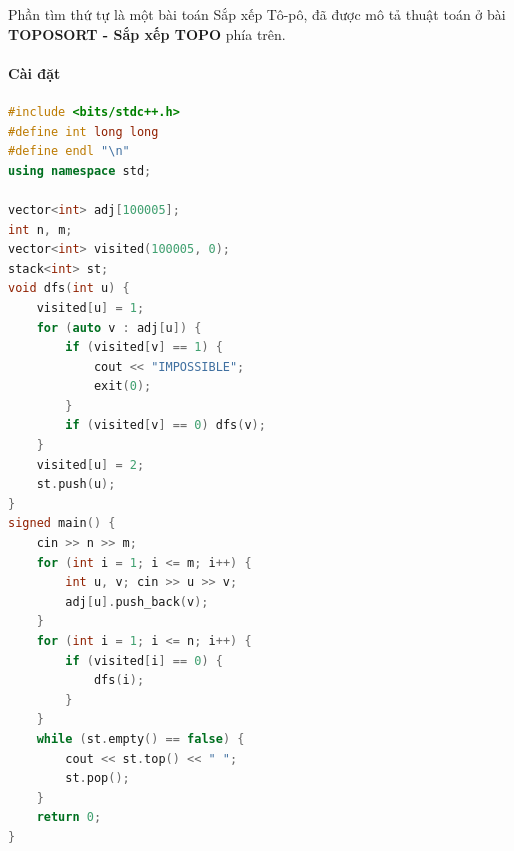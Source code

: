Phần tìm thứ tự là một bài toán Sắp xếp Tô-pô, đã được mô tả thuật toán ở bài \textbf{TOPOSORT - Sắp xếp TOPO} phía trên.

\paragraph{Cài đặt}
\begin{lstlisting}[language=C++]
#include <bits/stdc++.h>
#define int long long
#define endl "\n"
using namespace std;

vector<int> adj[100005];
int n, m; 
vector<int> visited(100005, 0);
stack<int> st;
void dfs(int u) {
    visited[u] = 1;
    for (auto v : adj[u]) {
        if (visited[v] == 1) {
            cout << "IMPOSSIBLE";
            exit(0);
        }
        if (visited[v] == 0) dfs(v);
    }
    visited[u] = 2;
    st.push(u);
}
signed main() {
    cin >> n >> m;
    for (int i = 1; i <= m; i++) {
        int u, v; cin >> u >> v;
        adj[u].push_back(v);
    }    
    for (int i = 1; i <= n; i++) {
        if (visited[i] == 0) {
            dfs(i);
        }
    }
    while (st.empty() == false) {
        cout << st.top() << " ";
        st.pop();
    }
    return 0;
}
\end{lstlisting}


